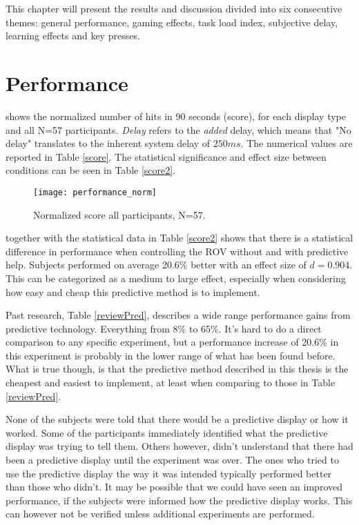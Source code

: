 This chapter will present the results and discussion divided into six consecutive themes: general performance, gaming effects, task load index, subjective delay, learning effects and key presses.

\section{Performance}

 shows the normalized number of hits in 90 seconds (score), for each display type and all N=57 participants. \textit{Delay} refers to the \textit{added} delay, which means that "No delay" translates to the inherent system delay of $250 ms$. The numerical values are reported in Table \ref{score}. The statistical significance and effect size between conditions can be seen in Table \ref{score2}.

\begin{figure}[h!]
    \centering
    \texttt{[image: performance\_norm]}
    \caption{Normalized score all participants, N=57.}
    \label{performanceNorm}
	\vspace{-0.2cm}
\end{figure}





 together with the statistical data in Table \ref{score2} shows that there is a statistical difference in performance when controlling the ROV without and with predictive help. Subjects performed on average 20.6\% better with an effect size of $d=0.904$. This can be categorized as a medium to large effect, especially when considering how easy and cheap this predictive method is to implement.

Past research, Table \ref{reviewPred}, describes a wide range performance gains from predictive technology. Everything from 8\% to 65\%. It's hard to do a direct comparison to any specific experiment, but a performance increase of 20.6\% in this experiment is probably in the lower range of what has been found before. What is true though, is that the predictive method described in this thesis is the cheapest and easiest to implement, at least when comparing to those in Table \ref{reviewPred}.

None of the subjects were told that there would be a predictive display or how it worked. Some of the participants immediately identified what the predictive display was trying to tell them. Others however, didn't understand that there had been a predictive display until the experiment was over. The ones who tried to use the predictive display the way it was intended typically performed better than those who didn't. It may be possible that we could have seen an improved performance, if the subjects were informed how the predictive display works. This can however not be verified unless additional experiments are performed.

